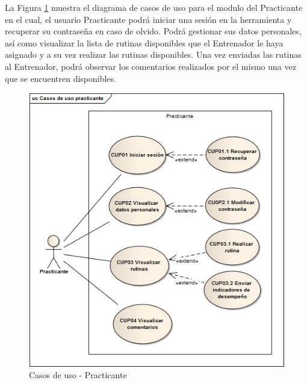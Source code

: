 La Figura \ref{fig:CU_Practicante}  muestra el diagrama de casos de uso para el modulo del Practicante en el cual, el usuario Practicante podrá iniciar una sesión en la herramienta y recuperar su contraseña en caso de olvido. Podrá gestionar sus datos personales, así como visualizar la lista de rutinas disponibles que el Entrenador le haya asignado y a su vez realizar las rutinas disponibles. Una vez enviadas las rutinas al Entrenador, podrá observar los comentarios realizados por el mismo una vez que se encuentren disponibles.

\begin{figure}[H]
	\begin{center}
		\includegraphics[scale=0.7]{./Figuras/Casos/Casos_de_uso_practicante}
	\end{center}
	\caption{Casos de uso - Practicante}
	\label{fig:CU_Practicante}
\end{figure}

\clearpage	%










